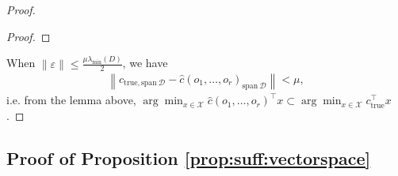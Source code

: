 \documentclass[11pt]{article}
\theoremstyle{plain}
\theoremstyle{definition}
\newcommand{\Vect}{\mathrm{span}~}
\newcommand{\norm}[1]{\left\lVert#1\right\rVert}
\newcommand{\ctrue}[0]{c_{\text{true}}}
\newcommand{\cX}{\mathcal{X}}
\newcommand{\cD}{\mathcal{D}}
\begin{document}
\begin{proof}
\begin{proof}
    \end{proof}
    
    When $\norm{\varepsilon}\leq \frac{\mu \lambda_{\text{min}}(D)}{2}$, we have 
    \begin{align*}
        \norm{c_{\text{true},\Vect \cD}-\hat{c}(o_1,\dots,o_r)_{\Vect \cD}}<\mu,
    \end{align*}
    i.e. from the lemma above, $\arg\min_{x\in \cX}\hat{c}(o_1,\dots,o_r)^\top x \subset \arg\min_{x\in \cX}\ctrue^\top x$.


    
    \end{proof}
 \subsection{Proof of Proposition \ref{prop:suff:vectorspace}} \label{proof prop:suff:vectorspace}
\end{document}
